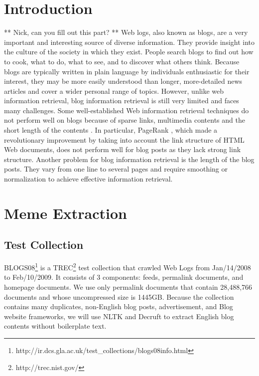 \documentclass{sig-alternate}
\begin{document}



\section{Introduction}

** Nick, can you fill out this part? **
Web logs, also known as blogs, are a very important and interesting source of diverse information. They provide insight into the culture of the society in which they exist. People search blogs to find out how to cook, what to do, what to see, and to discover what others think. Because blogs are typically written in plain language by individuals enthusiastic for their interest, they may be more easily understood than longer, more-detailed news articles and cover a wider personal range of topics. However, unlike web information retrieval, blog information retrieval is still very limited and faces many challenges. Some well-established Web information retrieval techniques do not perform well on blogs because of sparse links, multimedia contents and the short length of the contents \cite{Agarwal}. In particular, PageRank \cite{Brin1998a}, which made a revolutionary improvement by taking into account the link structure of HTML Web documents, does not perform well for blog posts as they lack strong link structure. Another problem for blog information retrieval is the length of the blog posts. They vary from one line to several pages and require smoothing or normalization to achieve effective information retrieval. 


\section{Meme Extraction}

\subsection{Test Collection}

BLOGS08\footnote{http://ir.dcs.gla.ac.uk/test\_collections/blogs08info.html} is a TREC\footnote{http://trec.nist.gov/} test collection that crawled Web Logs from Jan/14/2008 to Feb/10/2009. It consists of 3 components: feeds, permalink documents, and homepage documents. We use only permalink documents that contain 28,488,766 documents and whose uncompressed size is 1445GB. Because the collection contains many duplicates, non-English blog posts, advertisement, and Blog website frameworks, we will use NLTK and Decruft to extract English blog contents without boilerplate text.
\end{document}
